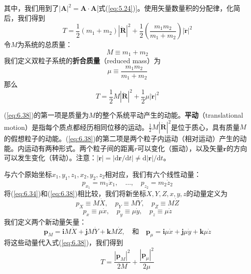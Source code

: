     其中，我们用到了$\left|\mathbf{A}\right|^2 = \mathbf{A}\cdot \mathbf{A}$[式(\ref{eq:5.24})]。使用矢量数量积的分配律，化简后，我们得到
    \begin{equation}
        T = \frac{1}{2}\left(m_1 + m_2\right)\left|\dot{\mathbf{R}}\right|^2 + \frac{1}{2}\left(\frac{m_1m_2}{m_1+m_2}\right)\left|\dot{\mathbf{r}}\right|^2
        \label{eq:6.35}
    \end{equation}
    令$M$为系统的总质量：
    \begin{equation}
        M \equiv m_1 + m_2
        \label{eq:6.36}
    \end{equation}
    我们定义双粒子系统的\textbf{折合质量}（reduced mass）为
    \begin{equation}
        \boxed{
            \mu \equiv \frac{m_1m_2}{m_1+m_2}
        }
        \label{eq:6.37}
    \end{equation}
    那么
    \begin{equation}
        T = \frac{1}{2}M\left|\dot{\mathbf{R}}\right|^2 + \frac{1}{2}\mu\left|\dot{\mathbf{r}}\right|^2
        \label{eq:6.38}
    \end{equation}

    (\ref{eq:6.38})的第一项是质量为$M$的整个系统平动产生的动能。\textbf{平动}（translational motion）是指每个质点都经历相同位移的运动。$\frac{1}{2}M\left|\dot{\mathbf{R}}\right|^2$是位于质心，具有质量$M$的假想粒子的动能。(\ref{eq:6.38})的第二项是两个粒子内运动（相对运动）产生的动能。内运动有两种形式。两个粒子间的距离$r$可以变化（振动），以及矢量$\mathbf{r}$的方向可以发生变化（转动）。注意：$\left|\dot{\mathbf{r}}\right| = \left|\mathrm{d}\mathbf{r}/\mathrm{d}t\right| \neq \mathrm{d}\left|\mathbf{r}\right|/\mathrm{d}t$。

    与六个原始坐标$x_1,y_1,z_1,x_2,y_2,z_2$相对应，我们有六个线性动量：
    \begin{equation}
        p_{x_1} = m_1\dot{x}_1, \quad \ldots, \quad p_{z_2} = m_2\dot{z}_2
        \label{eq:6.39}
    \end{equation}
    将(\ref{eq:6.34})和(\ref{eq:6.38})相比较，我们将新坐标$X,Y,Z,x,y,z$的动量定义为
    \begin{equation*}
        p_X \equiv M\dot{X}, \quad p_Y \equiv M\dot{Y}, \quad p_Z \equiv M\dot{Z}
    \end{equation*}
    \begin{equation*}
        p_x \equiv \mu\dot{x}, \quad p_y \equiv \mu\dot{y}, \quad p_z \equiv \mu\dot{z}
    \end{equation*}
    我们定义两个新动量矢量：
    \begin{equation*}
        \mathbf{p}_M = \mathbf{i}M\dot{X} + \mathbf{j}M\dot{Y} + \mathbf{k}M\dot{Z},
        \quad \text{和} \quad \mathbf{p}_{\mu} = \mathbf{i}\mu\dot{x} + \mathbf{j}\mu\dot{y} + \mathbf{k}\mu\dot{z}
    \end{equation*}
    将这些动量代入式(\ref{eq:6.38})，我们得到
    \begin{equation}
        T = \frac{\left|\mathbf{p}_M\right|^2}{2M} + \frac{\left|\mathbf{p}_{\mu}\right|^2}{2\mu}
        \label{eq:6.40}
    \end{equation}

